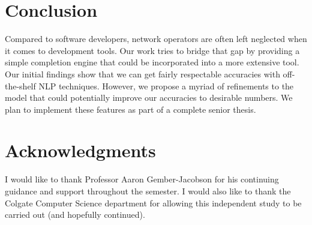\section{Conclusion}
Compared to software developers, network operators are often left neglected when it comes to development tools. Our work tries to bridge that gap by providing a simple completion engine that could be incorporated into a more extensive tool. Our initial findings show that we can get fairly respectable accuracies with off-the-shelf NLP techniques. However, we propose a myriad of refinements to the model that could potentially improve our accuracies to desirable numbers. We plan to implement these features as part of a complete senior thesis.

\section{Acknowledgments}
I would like to thank Professor Aaron Gember-Jacobson for his continuing guidance and support throughout the semester. I would also like to thank the Colgate Computer Science department for allowing this independent study to be carried out (and hopefully continued).